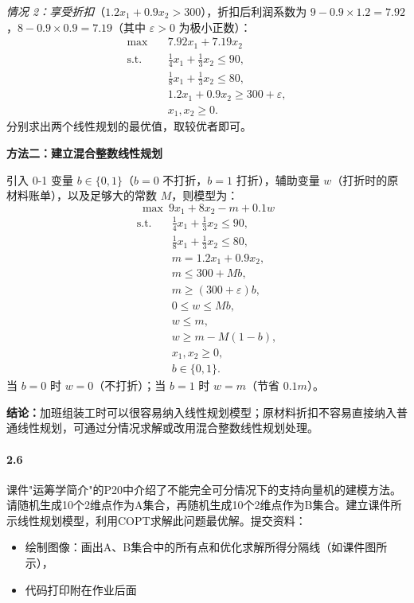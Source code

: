 \documentclass[12pt,a4paper]{article}
\begin{document}
\textit{情况 2：享受折扣}（$1.2x_1+0.9x_2> 300$），折扣后利润系数为 $9-0.9\times1.2=7.92$，$8-0.9\times0.9=7.19$（其中 $\varepsilon>0$ 为极小正数）：
\[
\begin{aligned}
\max\quad & 7.92x_1+7.19x_2\\
\text{s.t.}\quad
& \frac{1}{4}x_1+\frac{1}{3}x_2\le 90,\\
& \frac{1}{8}x_1+\frac{1}{3}x_2\le 80,\\
& 1.2x_1+0.9x_2\ge 300+\varepsilon,\\
& x_1,x_2\ge 0.
\end{aligned}
\]
分别求出两个线性规划的最优值，取较优者即可。

\textbf{方法二：建立混合整数线性规划}

引入 0-1 变量 $b\in\{0,1\}$（$b=0$ 不打折，$b=1$ 打折），辅助变量 $w$（打折时的原材料账单），以及足够大的常数 $M$，则模型为：
\[
\max\ 9x_1+8x_2-m+0.1w
\]
\[
\begin{aligned}
\text{s.t.}\quad
& \frac{1}{4}x_1+\frac{1}{3}x_2\le 90,\\
& \frac{1}{8}x_1+\frac{1}{3}x_2\le 80,\\
& m=1.2x_1+0.9x_2,\\
& m\le 300+Mb,\\
& m\ge (300+\varepsilon)b,\\
& 0\le w\le Mb,\\
& w\le m,\\
& w\ge m-M(1-b),\\
& x_1,x_2\ge 0,\\
& b\in\{0,1\}.
\end{aligned}
\]
当 $b=0$ 时 $w=0$（不打折）；当 $b=1$ 时 $w=m$（节省 $0.1m$）。

\textbf{结论：}加班组装工时可以很容易纳入线性规划模型；原材料折扣不容易直接纳入普通线性规划，可通过分情况求解或改用混合整数线性规划处理。

\paragraph{2.6}
课件"运筹学简介"的P20中介绍了不能完全可分情况下的支持向量机的建模方法。请随机生成10个2维点作为A集合，再随机生成10个2维点作为B集合。建立课件所示线性规划模型，利用COPT求解此问题最优解。提交资料：

\begin{itemize}
	\item 绘制图像：画出A、B集合中的所有点和优化求解所得分隔线（如课件图所示），
	
	\item 代码打印附在作业后面
\end{itemize}
\end{document}
